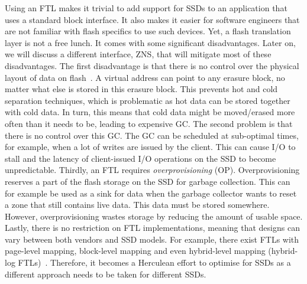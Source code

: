 Using an FTL makes it trivial to add support for SSDs to an application that uses a standard block interface. It also makes it easier for software engineers that are not familiar with flash specifics to use such devices. Yet, a flash translation layer is not a free lunch. It comes with some significant disadvantages. Later on, we will discuss a different interface, ZNS, that will mitigate most of these disadvantages. The first disadvantage is that there is no control over the physical layout of data on flash~\cite{bjorling2021zns}. A virtual address can point to any erasure block, no matter what else is stored in this erasure block. This prevents hot and cold separation techniques, which is problematic as hot data can be stored together with cold data. In turn, this means that cold data might be moved/erased more often than it needs to be, leading to expensive GC. The second problem is that there is no control over this GC. The GC can be scheduled at sub-optimal times, for example, when a lot of writes are issued by the client. This can cause I/O to stall and the latency of client-issued I/O operations on the SSD to become unpredictable. Thirdly, an FTL requires \textit{overprovisioning} (OP). Overprovisioning reserves a part of the flash storage on the SSD for garbage collection. This can for example be used as a sink for data when the garbage collector wants to reset a zone that still contains live data. This data must be stored somewhere. However, overprovisioning wastes storage by reducing the amount of usable space. Lastly, there is no restriction on FTL implementations, meaning that designs can vary between both vendors and SSD models. For example, there exist FTLs with page-level mapping, block-level mapping and even hybrid-level mapping (hybrid-log FTLs)~\cite{chen2009understanding}. Therefore, it becomes a Herculean effort to optimise for SSDs as a different approach needs to be taken for different SSDs.  

